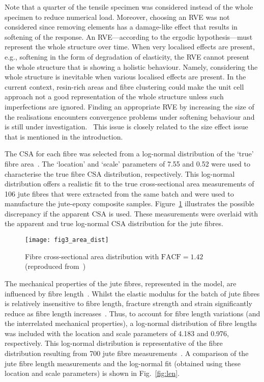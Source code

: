 	Note that a quarter of the tensile specimen was considered instead of the whole specimen to reduce numerical load. Moreover, choosing an RVE was not considered since removing elements has a damage-like effect that results in softening of the response. An RVE---according to the ergodic hypothesis---must represent the whole structure over time. When very localised effects are present, e.g., softening in the form of degradation of elasticity, the RVE cannot present the whole structure that is showing a holistic behaviour. Namely, considering the whole structure is inevitable when various localised effects are present. In the current context, resin-rich areas and fibre clustering could make the unit cell approach not a good representation of the whole structure unless such imperfections are ignored. Finding an appropriate RVE by increasing the size of the realisations encounters convergence problems under softening behaviour and is still under investigation.~\autocite{Gitman.2007} This issue is closely related to the size effect issue that is mentioned in the introduction.
	
	
	The CSA for each fibre was selected from a log-normal distribution of the `true' fibre area~\autocite{Virk.2010b}. The `location' and `scale' parameters of 7.55 and 0.52 were used to characterise the true fibre CSA distribution, respectively. This log-normal distribution offers a realistic fit to the true cross-sectional area measurements of 106 jute fibres that were extracted from the same batch and were used to manufacture the jute-epoxy composite samples. Figure~\ref{fig:fibCSA} illustrates the possible discrepancy if the apparent CSA is used. These measurements were overlaid with the apparent and true log-normal CSA distribution for the jute fibres. 
	\begin{figure}[!t]
		\centering
		\texttt{[image: fig3\_area\_dist]}
		\caption{Fibre cross-sectional area distribution with $\text{FACF}=1.42$ (reproduced from~\autocite{Virk.2013})}\label{fig:fibCSA}
	\end{figure}
	
	The mechanical properties of the jute fibres, represented in the model, are influenced by fibre length~\autocite{Virk.2013, Virk.2009,Virk.2011}. Whilst the elastic modulus for the batch of jute fibres is relatively insensitive to fibre length, fracture strength and strain significantly reduce as fibre length increases~\autocite{Virk.2013b,Virk.2009}. Thus, to account for fibre length variations (and the interrelated mechanical properties), a log-normal distribution of fibre lengths was included with the location and scale parameters of 4.183 and 0.976, respectively. This log-normal distribution is representative of the fibre distribution resulting from 700 jute fibre measurements~\autocite{Virk.2009}. A comparison of the jute fibre length measurements and the log-normal fit (obtained using these location and scale parameters) is shown in Fig.~\ref{fig:len}.%

